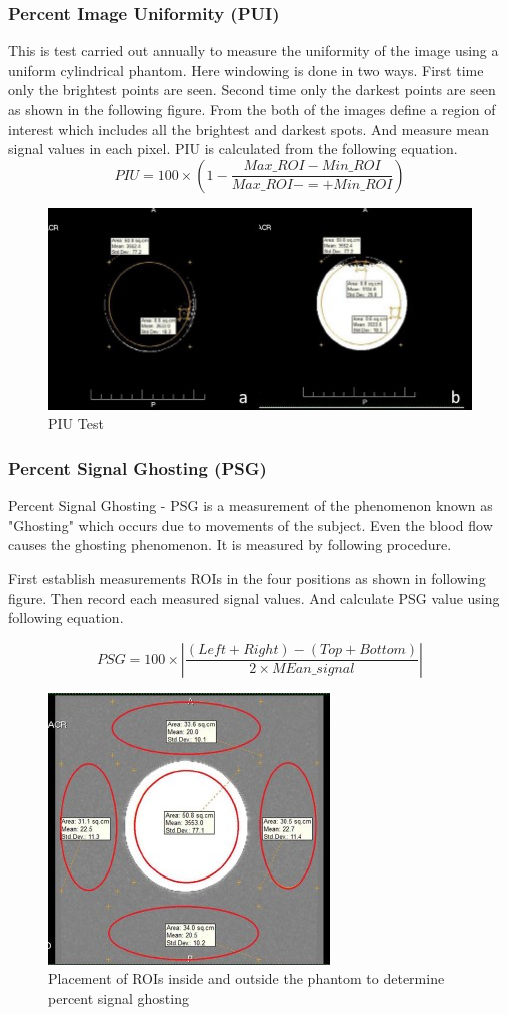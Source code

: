 \documentclass[12pt]{article}
\begin{document}
\subsubsection{Percent Image Uniformity (PUI)}
This is test carried out annually to measure the uniformity of the image using a uniform cylindrical phantom. Here windowing is done in two ways. First time only the brightest points are seen. Second time only the darkest points are seen as shown in the following figure. From the both of the images define a region of interest which includes all the brightest and darkest spots.  And measure mean signal values in each pixel. PIU is calculated from the following equation. 
\begin{equation*}
    PIU = 100 \times (1 - \frac{Max\_ROI - Min\_ROI}{Max\_ROI -=+ Min\_ROI})
\end{equation*}
\begin{figure}[h!]
    \centering
    \includegraphics[width=0.5\linewidth]{ph9.jpg}
    \caption{\small{PIU Test}}
    \label{fig:PIU Test}
\end{figure}

\subsubsection{Percent Signal Ghosting (PSG)}
Percent Signal Ghosting - PSG is a measurement of the phenomenon known as "Ghosting" which occurs due to movements of the subject. Even the blood flow causes the ghosting phenomenon. It is measured by following procedure. 

First establish measurements ROIs in the four positions as shown in following figure. Then record each measured signal values. And calculate PSG value using following equation. 

\begin{equation*}
    PSG = 100 \times |\frac{(Left+Right)-(Top+Bottom)}{2 \times MEan\_signal}|
\end{equation*}
\begin{figure}[h!]
    \centering
    \includegraphics[width=0.5\linewidth]{ph10.jpg}
    \caption{\small{Placement of ROIs inside and outside the phantom to determine percent signal ghosting}}
    \label{fig:PSG test}
\end{figure}
\end{document}
